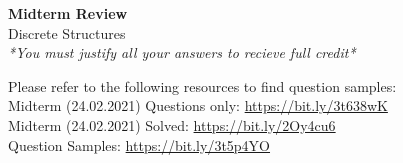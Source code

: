 \documentclass[a4paper,12pt]{article}
\begin{document}
\begin{center}
{\bf\Huge Midterm Review} \\[5pt]
Discrete Structures \\
\textit{*You must justify all your answers to recieve full credit*}
\end{center}



\noindent
Please refer to the following resources to find question samples:\\
Midterm (24.02.2021) Questions only: \url{https://bit.ly/3t638wK}\\
Midterm (24.02.2021) Solved: \url{https://bit.ly/2Oy4cu6}\\
Question Samples: \url{https://bit.ly/3t5p4YO}
\end{document}
